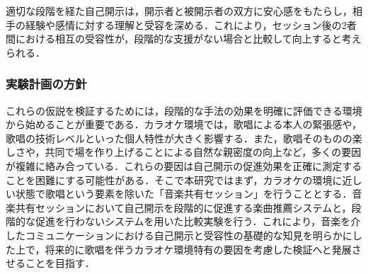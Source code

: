 適切な段階を経た自己開示は，開示者と被開示者の双方に安心感をもたらし，相手の経験や感情に対する理解と受容を深める．これにより，セッション後の2者間における相互の受容性が，段階的な支援がない場合と比較して向上すると考えられる．


\subsubsection{実験計画の方針}

これらの仮説を検証するためには，段階的な手法の効果を明確に評価できる環境から始めることが重要である．カラオケ環境では，歌唱による本人の緊張感や，歌唱の技術レベルといった個人特性が大きく影響する．また，歌唱そのものの楽しさや，共同で場を作り上げることによる自然な親密度の向上など，多くの要因が複雑に絡み合っている．これらの要因は自己開示の促進効果を正確に測定することを困難にする可能性がある．そこで本研究ではまず，カラオケの環境に近しい状態で歌唱という要素を除いた「音楽共有セッション」を行うこととする．音楽共有セッションにおいて自己開示を段階的に促進する楽曲推薦システムと，段階的な促進を行わないシステムを用いた比較実験を行う．これにより，音楽を介したコミュニケーションにおける自己開示と受容性の基礎的な知見を明らかにした上で，将来的に歌唱を伴うカラオケ環境特有の要因を考慮した検証へと発展させることを目指す．

